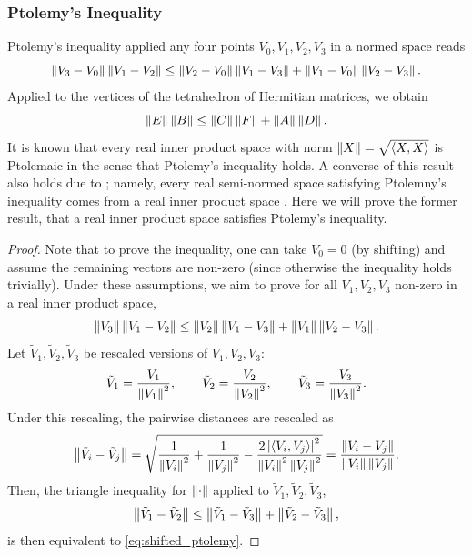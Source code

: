 \documentclass[notitlepage, 10pt]{article}
\begin{document}
\subsubsection{Ptolemy's Inequality}
Ptolemy's inequality applied any four points $V_0, V_1, V_2, V_3$ in a normed space reads
\begin{equation}
    \label{eq:vvvv_ptolemy}
    \left\lVert V_3-V_0\right\rVert\left\lVert V_1-V_2\right\rVert \leq \left\lVert V_2-V_0\right\rVert\left\lVert V_1-V_3\right\rVert + \left\lVert V_1-V_0\right\rVert\left\lVert V_2-V_3\right\rVert.
\end{equation}
Applied to the vertices of the tetrahedron of Hermitian matrices, we obtain
\begin{equation}
    \label{eq:abcdef_ptolemy}
    \left\lVert E\right\rVert\left\lVert B\right\rVert \leq \left\lVert C\right\rVert\left\lVert F\right\rVert + \left\lVert A\right\rVert\left\lVert D\right\rVert.
\end{equation}
It is known that every real inner product space with norm $\left\lVert X\right\rVert = \sqrt{\braket{X,X}}$ is Ptolemaic in the sense that Ptolemy's inequality holds.
A converse of this result also holds due to \citeauthor{schoenberg1952remark}; namely, every real semi-normed space satisfying Ptolemny's inequality comes from a real inner product space \cite{schoenberg1952remark}.
Here we will prove the former result, that a real inner product space satisfies Ptolemy's inequality.
\begin{proof}
    Note that to prove the inequality, one can take $V_0 = 0$ (by shifting) and assume the remaining vectors are non-zero (since otherwise the inequality holds trivially).
    Under these assumptions, we aim to prove for all $V_1, V_2, V_3$ non-zero in a real inner product space,
    \begin{equation}
        \label{eq:shifted_ptolemy}
        \left\lVert V_3\right\rVert\left\lVert V_1-V_2\right\rVert \leq \left\lVert V_2\right\rVert\left\lVert V_1-V_3\right\rVert + \left\lVert V_1\right\rVert\left\lVert V_2-V_3\right\rVert.
    \end{equation}
    Let $\tilde V_1, \tilde V_2, \tilde V_3$ be rescaled versions of $V_1,V_2,V_3$:
    \begin{equation}
        \tilde V_1 = \frac{V_1}{\left\lVert V_1\right\rVert^2}, \qquad
        \tilde V_2 = \frac{V_2}{\left\lVert V_2\right\rVert^2}, \qquad
        \tilde V_3 = \frac{V_3}{\left\lVert V_3\right\rVert^2}.
    \end{equation}
    Under this rescaling, the pairwise distances are rescaled as
    \begin{equation}
        \left\lVert\tilde V_i - \tilde V_j\right\rVert = \sqrt{\frac{1}{\left\lVert V_i\right\rVert^2} + \frac{1}{\left\lVert V_j\right\rVert^2} - \frac{2 \left|\braket{V_i,V_j}\right|^2}{\left\lVert V_i\right\rVert^2\left\lVert V_j\right\rVert^2}} = \frac{\left\lVert V_i-V_j\right\rVert}{\left\lVert V_i\right\rVert \left\lVert V_j\right\rVert}.
    \end{equation}
    Then, the triangle inequality for $\left\lVert\cdot\right\rVert$ applied to $\tilde V_1, \tilde V_2, \tilde V_3$,
    \begin{equation}
        \left\lVert \tilde V_1 - \tilde V_2\right\rVert \leq \left\lVert\tilde V_1 - \tilde V_3\right\rVert + \left\lVert\tilde V_2 - \tilde V_3\right\rVert,
    \end{equation}
    is then equivalent to \cref{eq:shifted_ptolemy}.
\end{proof}
\end{document}

